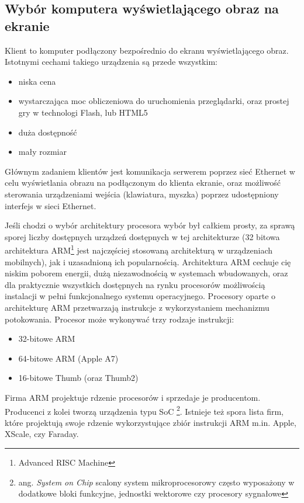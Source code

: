 \subsection{Wybór komputera wyświetlającego obraz na ekranie}
\label{sec:Komputer wyświetlający obraz na ekranie}

Klient to komputer podłączony bezpośrednio do ekranu wyświetlającego obraz. Istotnymi cechami takiego urządzenia są przede wszystkim:
\begin{itemize}
	\item niska cena
	\item wystarczająca moc obliczeniowa do uruchomienia przeglądarki, oraz prostej gry w technologi Flash, lub HTML5
	\item duża dostępność
	\item mały rozmiar
\end{itemize}

Głównym zadaniem klientów jest komunikacja serwerem poprzez sieć Ethernet w celu wyświetlania obrazu na podłączonym do klienta ekranie, oraz możliwość sterowania urządzeniami wejścia (klawiatura, myszka) poprzez udostępniony interfejs w sieci Ethernet.

Jeśli chodzi o wybór architektury procesora wybór był całkiem prosty, za sprawą sporej liczby dostępnych urządzeń dostępnych w tej architekturze (32 bitowa architektura ARM\footnote{Advanced RISC Machine} jest najczęściej stosowaną architekturą w urządzeniach mobilnych\cite{acm}), jak i uzasadnioną ich popularnością. Architektura ARM cechuje cię niskim poborem energii, dużą niezawodnością w systemach wbudowanych, oraz dla praktycznie wszystkich dostępnych na rynku procesorów możliwością instalacji w pełni funkcjonalnego systemu operacyjnego.
Procesory oparte o architekturę ARM przetwarzają instrukcje z wykorzystaniem mechanizmu potokowania. Procesor może wykonywać trzy rodzaje instrukcji:
\begin{itemize}
	\item 32-bitowe ARM
	\item 64-bitowe ARM (Apple A7)
	\item 16-bitowe Thumb (oraz Thumb2)
\end{itemize}

\par
Firma ARM projektuje rdzenie procesorów i sprzedaje je producentom. Producenci z kolei tworzą urządzenia typu SoC \footnote{ang. \emph{System on Chip} scalony system mikroprocesorowy często wyposażony w dodatkowe bloki funkcyjne, jednostki wektorowe czy procesory sygnałowe}. Istnieje też spora lista firm, które projektują swoje rdzenie wykorzystujące zbiór instrukcji ARM m.in. Apple, XScale, czy Faraday.

